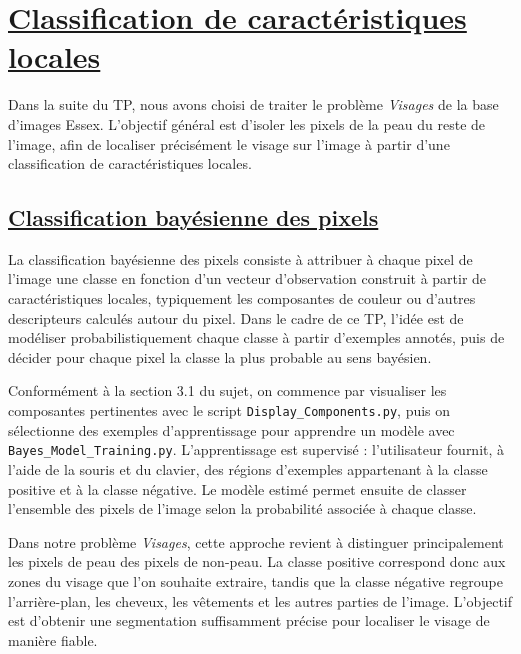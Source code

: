 \section{\underline{\textbf{Classification de caract\'eristiques locales}}}

Dans la suite du TP, nous avons choisi de traiter le probl\`eme \textit{Visages} de la base d'images Essex. L'objectif g\'en\'eral est d'isoler les pixels de la peau du reste de l'image, afin de localiser pr\'ecis\'ement le visage sur l'image \`a partir d'une classification de caract\'eristiques locales.

\subsection{\underline{\textbf{Classification bayésienne des pixels}}}


La classification bay\'esienne des pixels consiste \`a attribuer \`a chaque pixel de l'image une classe en fonction d'un vecteur d'observation construit \`a partir de caract\'eristiques locales, typiquement les composantes de couleur ou d'autres descripteurs calcul\'es autour du pixel. Dans le cadre de ce TP, l'id\'ee est de mod\'eliser probabilistiquement chaque classe \`a partir d'exemples annot\'es, puis de d\'ecider pour chaque pixel la classe la plus probable au sens bay\'esien.

Conform\'ement \`a la section 3.1 du sujet, on commence par visualiser les composantes pertinentes avec le script \texttt{Display\_Components.py}, puis on s\'electionne des exemples d'apprentissage pour apprendre un mod\`ele avec \texttt{Bayes\_Model\_Training.py}. L'apprentissage est supervis\'e : l'utilisateur fournit, \`a l'aide de la souris et du clavier, des r\'egions d'exemples appartenant \`a la classe positive et \`a la classe n\'egative. Le mod\`ele estim\'e permet ensuite de classer l'ensemble des pixels de l'image selon la probabilit\'e associ\'ee \`a chaque classe.

Dans notre probl\`eme \textit{Visages}, cette approche revient \`a distinguer principalement les pixels de peau des pixels de non-peau. La classe positive correspond donc aux zones du visage que l'on souhaite extraire, tandis que la classe n\'egative regroupe l'arri\`ere-plan, les cheveux, les v\^etements et les autres parties de l'image. L'objectif est d'obtenir une segmentation suffisamment pr\'ecise pour localiser le visage de mani\`ere fiable.

